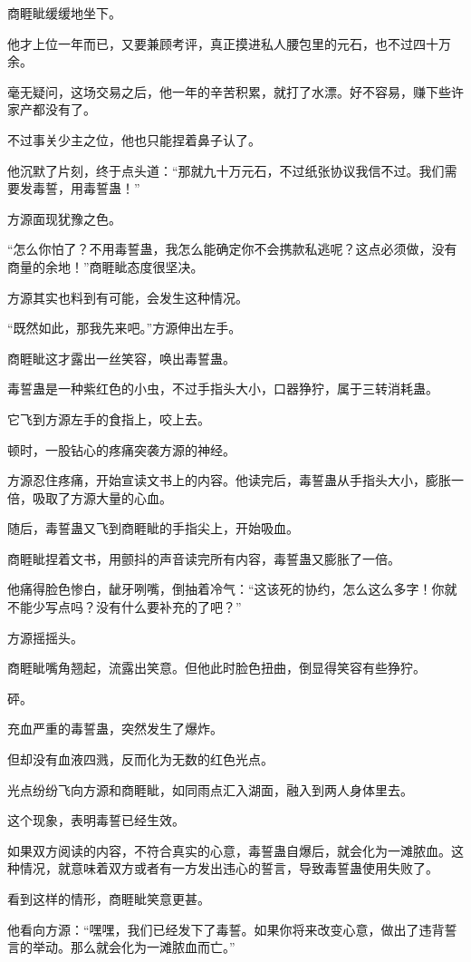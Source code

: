 \begin{this_body}
商睚眦缓缓地坐下。

他才上位一年而已，又要兼顾考评，真正摸进私人腰包里的元石，也不过四十万余。

毫无疑问，这场交易之后，他一年的辛苦积累，就打了水漂。好不容易，赚下些许家产都没有了。

不过事关少主之位，他也只能捏着鼻子认了。

他沉默了片刻，终于点头道：“那就九十万元石，不过纸张协议我信不过。我们需要发毒誓，用毒誓蛊！”

方源面现犹豫之色。

“怎么你怕了？不用毒誓蛊，我怎么能确定你不会携款私逃呢？这点必须做，没有商量的余地！”商睚眦态度很坚决。

方源其实也料到有可能，会发生这种情况。

“既然如此，那我先来吧。”方源伸出左手。

商睚眦这才露出一丝笑容，唤出毒誓蛊。

毒誓蛊是一种紫红色的小虫，不过手指头大小，口器狰狞，属于三转消耗蛊。

它飞到方源左手的食指上，咬上去。

顿时，一股钻心的疼痛突袭方源的神经。

方源忍住疼痛，开始宣读文书上的内容。他读完后，毒誓蛊从手指头大小，膨胀一倍，吸取了方源大量的心血。

随后，毒誓蛊又飞到商睚眦的手指尖上，开始吸血。

商睚眦捏着文书，用颤抖的声音读完所有内容，毒誓蛊又膨胀了一倍。

他痛得脸色惨白，龇牙咧嘴，倒抽着冷气：“这该死的协约，怎么这么多字！你就不能少写点吗？没有什么要补充的了吧？”

方源摇摇头。

商睚眦嘴角翘起，流露出笑意。但他此时脸色扭曲，倒显得笑容有些狰狞。

砰。

充血严重的毒誓蛊，突然发生了爆炸。

但却没有血液四溅，反而化为无数的红色光点。

光点纷纷飞向方源和商睚眦，如同雨点汇入湖面，融入到两人身体里去。

这个现象，表明毒誓已经生效。

如果双方阅读的内容，不符合真实的心意，毒誓蛊自爆后，就会化为一滩脓血。这种情况，就意味着双方或者有一方发出违心的誓言，导致毒誓蛊使用失败了。

看到这样的情形，商睚眦笑意更甚。

他看向方源：“嘿嘿，我们已经发下了毒誓。如果你将来改变心意，做出了违背誓言的举动。那么就会化为一滩脓血而亡。”


\end{this_body}
